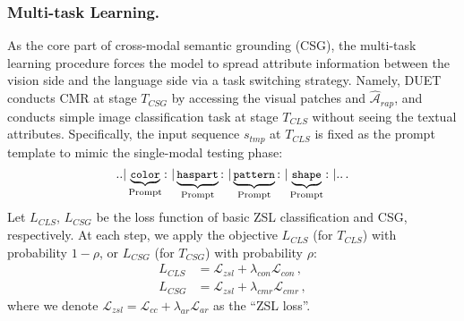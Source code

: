 \documentclass[letterpaper]{article} \usepackage{aaai23}  \usepackage{times}  \usepackage{helvet}  \usepackage{courier}  \usepackage[hyphens]{url}  \usepackage{graphicx} \urlstyle{rm} \def\UrlFont{\rm}  \usepackage{natbib}  \usepackage{caption} \frenchspacing  \setlength{\pdfpagewidth}{8.5in}  \setlength{\pdfpageheight}{11in}  \usepackage{algorithm}
\begin{document}
\subsubsection{\textbf{Multi-task Learning.} }
As the core part of cross-modal semantic grounding (CSG), 
the multi-task learning procedure \cite{DBLP:conf/nips/SenerK18,DBLP:conf/cvpr/WhiteheadWJFS21} forces the model to spread attribute information between the {vision side and the language side via a} task switching strategy. 
{Namely,} DUET conducts CMR at stage $T_{CSG}$ by accessing the visual patches and $\widehat{\mathcal{A}}_{rap}$, {and conducts} simple image classification task at stage $T_{CLS}$ without seeing {the} textual attributes. 
Specifically,  
the input sequence $s_{tmp}$ at $T_{CLS}$ {is}
fixed as the prompt template to mimic the single-modal testing phase:
\begin{equation}\label{eq:template}
\small
	{\tt{..}} {\tt|} \underbrace{{\tt{color}}}_{\textrm{Prompt}} {\tt:}~ {\tt|}  \underbrace{{\tt{has part}}}_{\textrm{Prompt}} {\tt:}~  {\tt|}	 \underbrace{{\tt{pattern}}}_{\textrm{Prompt}} {\tt:}~  {\tt|} \underbrace{{\tt{shape}}}_{\textrm{Prompt}} {\tt:}~  {\tt|} {\tt{..}}\, .
\end{equation}
Let {${L}_{CLS}$, ${L}_{CSG}$} be the loss function of basic ZSL classification and CSG, respectively. At each step, we apply the objective $L_{CLS}$ (for $T_{CLS}$) with probability $1-\rho$, or $L_{CSG}$ (for $T_{CSG}$) with probability $\rho$:
\begin{align}
L_{CLS} &= \mathcal{L}_{zsl} + \lambda_{con} \mathcal{L}_{con}\,,\\
L_{CSG} &= \mathcal{L}_{zsl} + \lambda_{cmr} \mathcal{L}_{cmr}\,,
\end{align}
where we denote $\mathcal{L}_{zsl} = \mathcal{L}_{cc}+\lambda_{ar} \mathcal{L}_{ar}$ as the ``ZSL loss''.
\end{document}
